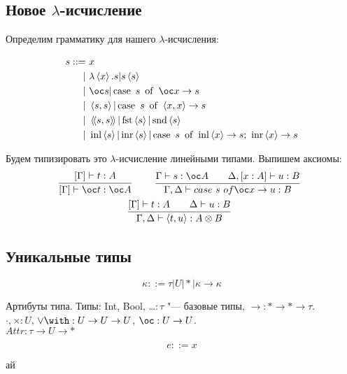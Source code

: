 \subsection{\texorpdfstring{Новое $\lambda$-исчисление}{}}
Определим грамматику для нашего $\lambda$-исчисления:
\begin{bnf}
\begin{alignat*}{2}
	s ::= &\ x \\
              | &\ \lambda\left<x\right>.s | s\left<s\right> \\
			  | &\ \oc s | \caseb{s}{\oc x \rightarrow s} \\
			  | &\ \pair{s,s} | \caseb{s}{\pair{x,x} \rightarrow s} \\
			  | &\ \ppair{s,s} | \fst \pair{s} | \snd \pair{s} \\
			  | &\ \inl \pair{s} | \inr \pair{s}|
                    \casec{s}{\inl \pair{x} \rightarrow s}{\inr \pair{x} \rightarrow s}
\end{alignat*}
\end{bnf}
Будем типизировать это $\lambda$-исчисление линейными типами. Выпишем аксиомы:
\begin{gather*}
	\infer[]
		{\left[\Gamma\right]\vdash \oc t : \oc A}
		{\left[\Gamma\right]\vdash t : A}
	\qquad
	\infer[]
		{\Gamma, \Delta\vdash case~s~of \oc x \rightarrow u : B}
		{\Gamma\vdash s : \oc A && \Delta, \left[x : A\right]\vdash u : B}
	\\
	\infer[]
		{\Gamma, \Delta\vdash \left<t, u\right> : A \otimes B}
		{\left[\Gamma\right]\vdash t : A && \Delta\vdash u : B}
\end{gather*}


\subsection{\texorpdfstring{Уникальные типы}{Unique types}}

\begin{bnf}
\[
    \kappa ::= \tau | U | * | \kappa \rightarrow \kappa
\]
\end{bnf}

Артибуты типа.
Типы: Int, Bool, \ldots $: \tau$ "--- базовые типы, $\rightarrow : * \rightarrow * \rightarrow \tau$. \\
$\cdot, \times : U$, $\vee \with : U \rightarrow U \rightarrow U$, $\oc : U \rightarrow U$. \\
$Attr : \tau \rightarrow U \rightarrow *$

\begin{bnf}
\[
    e ::= x
\]
\end{bnf}

ай
